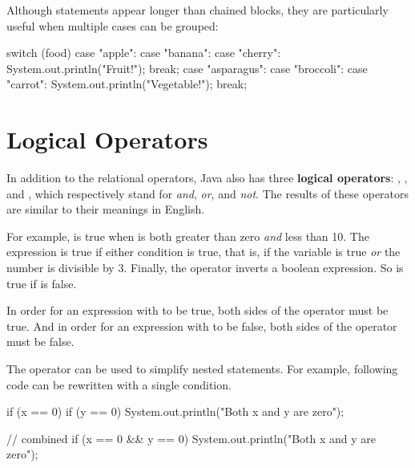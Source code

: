 Although  statements appear longer than chained  blocks, they are particularly useful when multiple cases can be grouped:

\begin{code}
switch (food) {
    case "apple":
    case "banana":
    case "cherry":
        System.out.println("Fruit!");
        break;
    case "asparagus":
    case "broccoli":
    case "carrot":
        System.out.println("Vegetable!");
        break;
}\end{code}



\section{Logical Operators}


In addition to the relational operators, Java also has three {\bf logical operators}: \java{&&}, \java{||}, and \java{!}, which respectively stand for {\em and}, {\em or}, and {\em not}.
The results of these operators are similar to their meanings in English.

For example,  is true when  is both greater than zero {\em and} less than 10.
The expression  is true if either condition is true, that is, if the variable  is true {\em or} the number  is divisible by 3.
Finally, the \java{!} operator inverts a boolean expression.
So  is true if  is false.

In order for an expression with \java{&&} to be true, both sides of the \java{&&} operator must be true.
And in order for an expression with \java{||} to be false, both sides of the \java{||} operator must be false.

The \java{&&} operator can be used to simplify nested  statements.
For example, following code can be rewritten with a single condition.

\begin{code}
if (x == 0) {
    if (y == 0) {
        System.out.println("Both x and y are zero");
    }
}
\end{code}

\begin{code}
// combined
if (x == 0 && y == 0) {
    System.out.println("Both x and y are zero");
}
\end{code}

